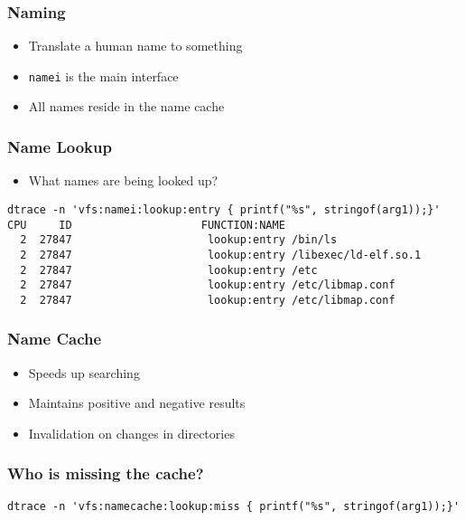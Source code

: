 \documentclass[pdftex]{beamer} %
\begin{document}
\begin{frame}[fragile]
  \frametitle{Naming}
  \begin{itemize}
  \item Translate a human name to something
  \item \verb+namei+ is the main interface
  \item All names reside in the name cache
  \end{itemize}
\end{frame}

\begin{frame}[fragile]
  \frametitle{Name Lookup}
  \begin{itemize}
  \item What names are being looked up?
  \end{itemize}
\begin{lstlisting}
dtrace -n 'vfs:namei:lookup:entry { printf("%s", stringof(arg1));}'
CPU     ID                    FUNCTION:NAME
  2  27847                     lookup:entry /bin/ls
  2  27847                     lookup:entry /libexec/ld-elf.so.1
  2  27847                     lookup:entry /etc
  2  27847                     lookup:entry /etc/libmap.conf
  2  27847                     lookup:entry /etc/libmap.conf
\end{lstlisting}
\end{frame}

\begin{frame}
  \frametitle{Name Cache}
  \begin{itemize}
  \item Speeds up searching
  \item Maintains positive and negative results
  \item Invalidation on changes in directories
  \end{itemize}
\end{frame}

\begin{frame}[fragile]
  \frametitle{Who is missing the cache?}
\begin{lstlisting}
dtrace -n 'vfs:namecache:lookup:miss { printf("%s", stringof(arg1));}'
\end{lstlisting}
\end{frame}
\end{document}
